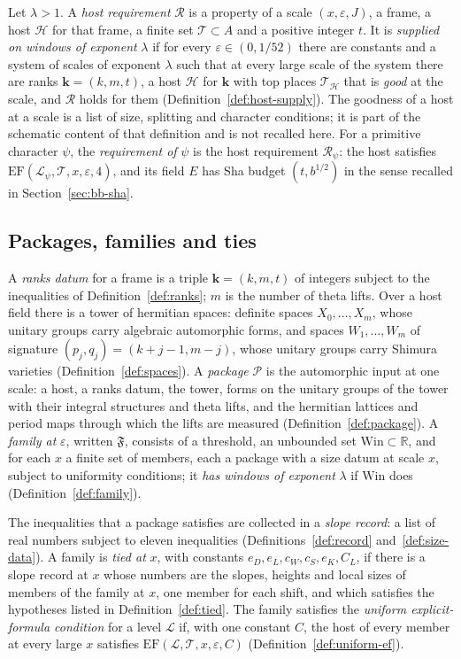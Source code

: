 \documentclass[11pt]{amsbook}
\theoremstyle{plain}
\theoremstyle{definition}
\theoremstyle{remark}
\numberwithin{equation}{section}
\numberwithin{figure}{chapter}
\numberwithin{table}{chapter}
\newcommand{\R}{\mathbb{R}}
\newcommand{\eps}{\varepsilon}
\newcommand{\lev}{\mathscr{L}}
\newcommand{\Top}{\mathcal{T}}
\newcommand{\Fam}{\mathfrak{F}}
\newcommand{\Win}{\mathrm{Win}}
\begin{document}
Let $\lambda>1$. A \emph{host requirement} $\mathscr R$ is a property
of a scale $(x,\eps,J)$, a frame, a host $\mathcal H$ for that frame,
a finite set $\Top\subset A$ and a positive integer $t$. It is
\emph{supplied on windows of exponent} $\lambda$ if for every
$\eps\in(0,1/52)$ there are constants and a system of scales of
exponent $\lambda$ such that at every large scale of the system there
are ranks $\mathbf k=(k,m,t)$, a host $\mathcal H$ for $\mathbf k$
with top places $\Top_{\mathcal H}$ that is \emph{good} at the scale,
and $\mathscr R$ holds for them (Definition~\ref{def:host-supply}).
The goodness of a host at a scale is a list of size, splitting and
character conditions; it is part of the schematic content of that
definition and is not recalled here. For a primitive character
$\psi$, the \emph{requirement of} $\psi$ is the host requirement
$\mathscr R_\psi$: the host satisfies
$\mathrm{EF}(\lev_\psi,\Top,x,\eps,4)$, and its field $E$ has Sha
budget $(t,b^{1/2})$ in the sense recalled in
Section~\ref{sec:bb-sha}.

\subsection*{Packages, families and ties}

A \emph{ranks datum} for a frame is a triple $\mathbf k=(k,m,t)$ of
integers subject to the inequalities of Definition~\ref{def:ranks};
$m$ is the number of theta lifts. Over a host field there is a tower
of hermitian spaces: definite spaces $X_0,\dots,X_m$, whose unitary
groups carry algebraic automorphic forms, and spaces $W_1,\dots,W_m$
of signature $(p_j,q_j)=(k+j-1,m-j)$, whose unitary groups carry
Shimura varieties (Definition~\ref{def:spaces}). A \emph{package}
$\mathcal P$ is the automorphic input at one scale: a host, a ranks
datum, the tower, forms on the unitary groups of the tower with
their integral structures and theta lifts, and the hermitian
lattices and period maps through which the lifts are measured
(Definition~\ref{def:package}). A \emph{family at} $\eps$, written
$\Fam$, consists of a threshold, an unbounded set $\Win\subset\R$,
and for each $x$ a finite set of members, each a package with a size
datum at scale $x$, subject to uniformity conditions; it \emph{has
windows of exponent} $\lambda$ if $\Win$ does
(Definition~\ref{def:family}).

The inequalities that a package satisfies are collected in a
\emph{slope record}: a list of real numbers subject to eleven
inequalities (Definitions~\ref{def:record} and~\ref{def:size-data}).
A family is \emph{tied at} $x$, with constants $e_D,e_L,c_W,c_S,
e_K,C_L$, if there is a slope record at $x$ whose numbers are the
slopes, heights and local sizes of members of the family at $x$, one
member for each shift, and which satisfies the hypotheses listed in
Definition~\ref{def:tied}. The family satisfies the \emph{uniform
explicit-formula condition} for a level $\lev$ if, with one constant
$C$, the host of every member at every large $x$ satisfies
$\mathrm{EF}(\lev,\Top,x,\eps,C)$ (Definition~\ref{def:uniform-ef}).
\end{document}
